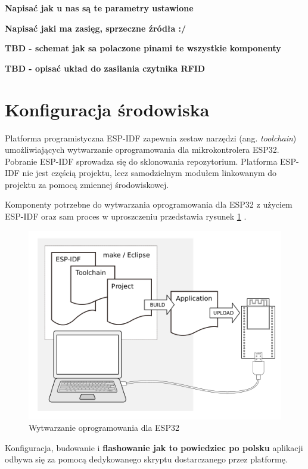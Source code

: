             \textbf{Napisać jak u nas są te parametry ustawione}

            \textbf{Napisać jaki ma zasięg, sprzeczne źródła :/}

            \textbf{TBD - schemat jak sa polaczone pinami te wszystkie komponenty}

            \textbf{TBD - opisać układ do zasilania czytnika RFID}

    \section{Konfiguracja środowiska}

        Platforma programistyczna ESP-IDF zapewnia zestaw narzędzi (ang. \textit{toolchain}) umożliwiających wytwarzanie oprogramowania dla mikrokontrolera ESP32. Pobranie ESP-IDF sprowadza się do sklonowania repozytorium. Platforma ESP-IDF nie jest częścią projektu, lecz samodzielnym modułem linkowanym do projektu za pomocą zmiennej środowiskowej.

        Komponenty potrzebne do wytwarzania oprogramowania dla ESP32 z użyciem ESP-IDF oraz sam proces w uproszczeniu przedstawia rysunek \ref{fig:esp32_dev} \cite{esp-idf-get-started}.

        \begin{figure}[]
            \centering
            \includegraphics[width=\textwidth]{chapters/images/esp32_dev.png}
            \caption{Wytwarzanie oprogramowania dla ESP32}
            \label{fig:esp32_dev}
        \end{figure}

        Konfiguracja, budowanie i \textbf{flashowanie jak to powiedziec po polsku} aplikacji odbywa się za pomocą dedykowanego skryptu dostarczanego przez platformę.

